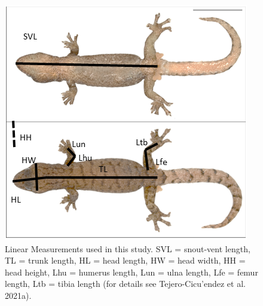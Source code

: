 \documentclass[
]{article}
\begin{document}
\begin{figure}

{\centering \includegraphics[width=1\linewidth]{Figs/Fig1} 

}

\caption{Linear Measurements used in this study. SVL = snout-vent length, TL = trunk length, HL = head length, HW = head width, HH = head height, Lhu = humerus length, Lun = ulna length, Lfe = femur length, Ltb = tibia length (for details see Tejero-Cicu{'{e}}ndez et al. 2021a).}\label{fig:unnamed-chunk-1}
\end{figure}

\newpage
\end{document}
